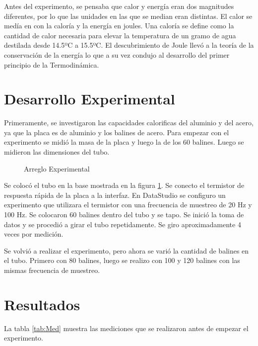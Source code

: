 \documentclass[12pt]{article}
\begin{document}
\hspace{0.5cm}Antes del experimento, se pensaba que calor y energía eran dos magnitudes diferentes, por lo que las unidades en las que se median eran distintas. El calor se medía en con la caloría y la energía en joules. Una caloría se define como la cantidad de calor necesaria para elevar la temperatura de un gramo de agua destilada desde 14.5ºC a 15.5ºC. El descubrimiento de Joule llevó a la teoría de la conservación de la energía lo que a su vez condujo al desarrollo del primer principio de la Termodinámica.\vspace{-0.5cm}
\section{Desarrollo Experimental}\vspace{-0.5cm}
Primeramente, se investigaron las capacidades calorificas del aluminio y del acero, ya que la placa es de aluminio y los balines de acero. Para empezar con el experimento se midió la masa de la placa y luego la de los 60 balines. Luego se midieron las dimensiones del tubo.

\begin{figure}[H]
\centering
\caption{Arreglo Experimental}
\label{fig:Arreglo}
\end{figure}

Se colocó el tubo en la base mostrada en la figura \ref{fig:Arreglo}. Se conecto el termistor de respuesta rápida de la placa a la interfaz.  En DataStudio se configuro un experimento que utilizara el termistor con una frecuencia de muestreo de 20 Hz y 100 Hz. Se colocaron 60 balines dentro del tubo y se tapo. Se inició la toma de datos y se procedió a girar el tubo repetidamente. Se giro aproximadamente 4 veces por medición. 

Se volvió a realizar el experimento, pero ahora se varió la cantidad de balines en el tubo. Primero  con 80 balines, luego se realizo con 100 y 120 balines con las mismas frecuencia de muestreo.

\section{Resultados}
La tabla \ref{tab:Med} muestra las mediciones que se realizaron antes de empezar el experimento.
\end{document}
